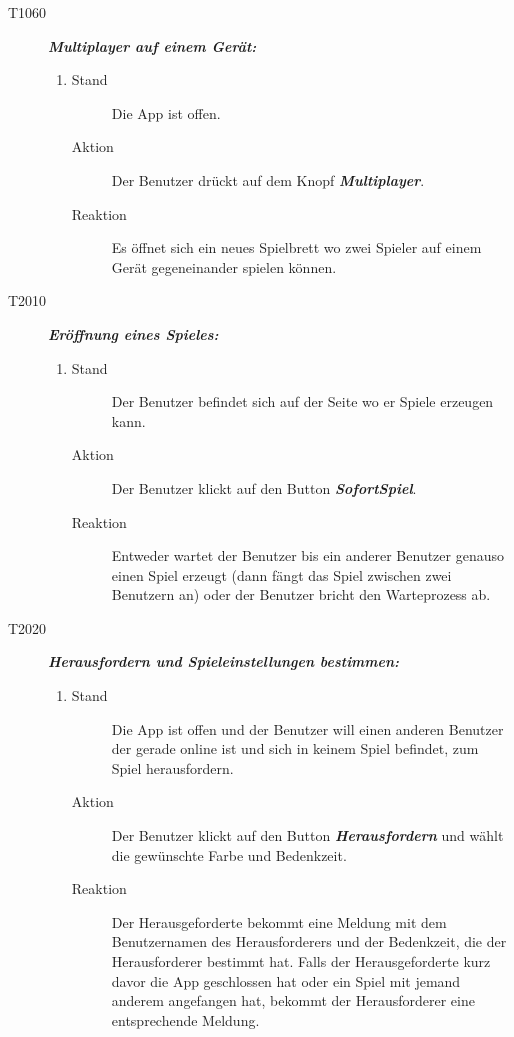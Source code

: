 \documentclass[parskip=full]{scrartcl}
\begin{document}
\begin{description}
	\item[T1060] \textbf{\textit{Multiplayer auf einem Gerät: }} 
	\begin{enumerate}
		\item 
		\begin{description}
			\item[Stand] Die App ist offen.
			\item[Aktion] Der Benutzer drückt auf dem Knopf \textbf{\textit{Multiplayer}}.
			\item[Reaktion] Es öffnet sich ein neues Spielbrett wo zwei Spieler auf einem Gerät gegeneinander spielen können.
		\end{description}
	\end{enumerate}
	
	\item[T2010] \textbf{\textit{Eröffnung eines Spieles: }} 
	\begin{enumerate}
		\item 
		\begin{description}
			\item[Stand] Der Benutzer befindet sich auf der Seite wo er Spiele erzeugen kann.
			\item[Aktion] Der Benutzer klickt auf den Button \textbf{\textit{SofortSpiel}}. 
			\item[Reaktion] Entweder wartet der Benutzer bis ein anderer Benutzer genauso einen Spiel erzeugt (dann fängt das Spiel zwischen zwei Benutzern an) oder der Benutzer bricht den Warteprozess ab.
		\end{description}
	\end{enumerate}
	
	\item[T2020] \textbf{\textit{Herausfordern und Spieleinstellungen bestimmen: }} 
	\begin{enumerate}
		\item 
		\begin{description}
			\item[Stand] Die App ist offen und der Benutzer will einen anderen Benutzer der gerade online ist und sich in keinem Spiel befindet, zum Spiel herausfordern.
			\item[Aktion] Der Benutzer klickt auf den Button \textbf{\textit{Herausfordern }} und wählt die gewünschte Farbe und \gls{Bedenkzeit}.
			\item[Reaktion] Der Herausgeforderte bekommt eine Meldung mit dem Benutzernamen des Herausforderers und der \gls{Bedenkzeit}, die der Herausforderer bestimmt hat. Falls der Herausgeforderte kurz davor die App geschlossen hat oder ein Spiel mit jemand anderem angefangen hat, bekommt der Herausforderer eine entsprechende Meldung.
		\end{description}
	\end{enumerate}
	

\end{description}
\end{document}
